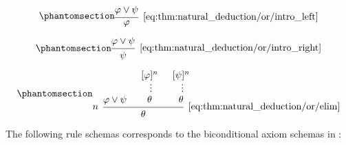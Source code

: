 \begin{proposition}
\begin{thmenum}
    \begin{minipage}{0.3\textwidth}
      \begin{equation*}\taglabel[\textrm{R} \( \vee_L^+ \)]{eq:thm:natural_deduction/or/intro_left}
        \begin{prooftree}
          \hypo{ \varphi \vee \psi }
          \infer1[\ref{eq:thm:natural_deduction/or/intro_left}]{ \varphi }
        \end{prooftree}
      \end{equation*}
    \end{minipage}
    \hfill
    \begin{minipage}{0.3\textwidth}
      \begin{equation*}\taglabel[\textrm{R} \( \vee_R^+ \)]{eq:thm:natural_deduction/or/intro_right}
        \begin{prooftree}
          \hypo{ \varphi \vee \psi }
          \infer1[\ref{eq:thm:natural_deduction/or/intro_right}]{ \psi }
        \end{prooftree}
      \end{equation*}
    \end{minipage}
    \hfill
    \begin{minipage}{0.3\textwidth}
      \begin{equation*}\taglabel[\textrm{R} \( \vee^- \)]{eq:thm:natural_deduction/or/elim}
        \begin{prooftree}
          \hypo{ \varphi \vee \psi }
          \hypo{ [\varphi]^n }
          \ellipsis {} { \theta }
          \hypo{ [\psi]^n }
          \ellipsis {} { \theta }
          \infer[left label=\( n \)]3[\ref{eq:thm:natural_deduction/or/elim}]{ \theta }
        \end{prooftree}
      \end{equation*}
    \end{minipage}

     The following rule schemas corresponds to the biconditional axiom schemas in :


\end{thmenum}
\end{proposition}
